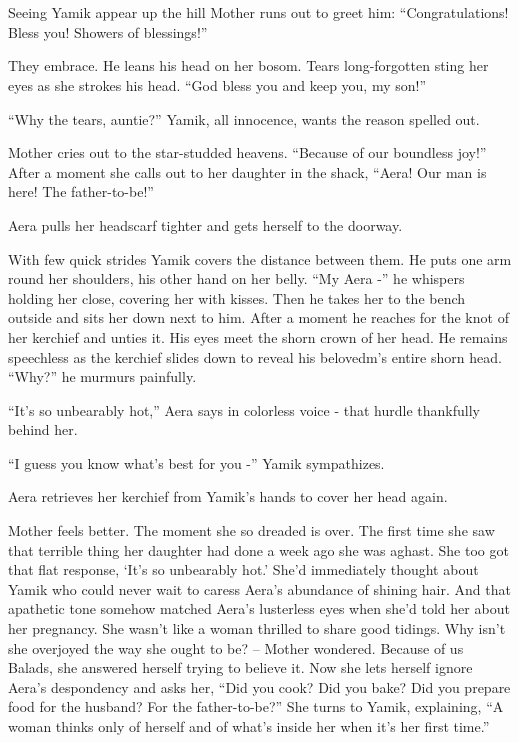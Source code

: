 \documentclass[twoside,11pt]{book}
\begin{document}
\chapter{}

Seeing Yamik appear up the hill Mother runs out to greet him: ``Congratulations! Bless you! Showers of
blessings!''

They embrace. He leans his head on her bosom. Tears long-forgotten sting her eyes as she strokes his head.
``God bless you and keep you, my son!''

``Why the tears, auntie?'' Yamik, all innocence, wants the reason spelled out.

Mother cries out to the star-studded heavens. ``Because of our boundless joy!'' After a
moment she calls out to her daughter in the shack, ``Aera! Our man is here! The
father-to-be!''

Aera pulls her headscarf tighter and gets herself to the doorway.

With few quick strides Yamik covers the distance between them. He puts one arm round her shoulders, his other hand on
her belly. ``My Aera -'' he whispers holding her close, covering her with kisses. Then he
takes her to the bench outside and sits her down next to him. After a moment he reaches for the knot of her kerchief
and unties it. His eyes meet the shorn crown of her head. He remains speechless as the kerchief slides down to reveal
his belovedm's entire shorn head. ``Why?'' he murmurs painfully.

``It's so unbearably hot,'' Aera says in colorless voice - that hurdle thankfully behind her.

``I guess you know what's best for you -'' Yamik sympathizes.

Aera retrieves her kerchief from Yamik's hands to cover her head again.

Mother feels better. The moment she so dreaded is over. The first time she saw that terrible thing her daughter had done
a week ago she was aghast. She too got that flat response, `It's so unbearably hot.' She'd immediately thought about
Yamik who could never wait to caress Aera's abundance of shining hair. And that apathetic tone somehow matched Aera's
lusterless eyes when she'd told her about her pregnancy. She wasn't like a woman thrilled to share good tidings. Why
isn't she overjoyed the way she ought to be? -- Mother wondered. Because of us Balads, she answered herself trying to
believe it. Now she lets herself ignore Aera's despondency and asks her, ``Did you cook? Did you bake? Did
you prepare food for the husband? For the father-to-be?'' She turns to Yamik, explaining, ``A
woman thinks only of herself and of what's inside her when it's her first time.''
\end{document}
